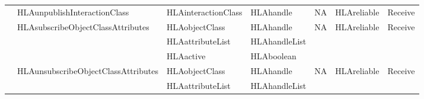 \begin{landscape}
\begin{momtabletypeset}[8.00]
{{\begin{tabular}{|Y{116.92pt}|Y{137.54pt}|Y{76.22pt}|Y{103.88pt}|Y{65.90pt}|Y{66.32pt}|Y{38.52pt}|}
                    & HLAunpublishInteractionClass        & HLAinteractionClass             & HLAhandle        & NA          & HLAreliable & Receive \\
                    & HLAsubscribeObjectClassAttributes   & HLAobjectClass                  & HLAhandle        & NA          & HLAreliable & Receive \\
                    &                                     & HLAattributeList                & HLAhandleList    &             &             &         \\
                    &                                     & HLAactive                       & HLAboolean       &             &             &         \\
                    & HLAunsubscribeObjectClassAttributes & HLAobjectClass                  & HLAhandle        & NA          & HLAreliable & Receive \\
                    &                                     & HLAattributeList                & HLAhandleList    &             &             &         \\
                    \hline
                \end{tabular}%
            }%
        }%
    \end{momtabletypeset}
    \newpage


\end{landscape}

